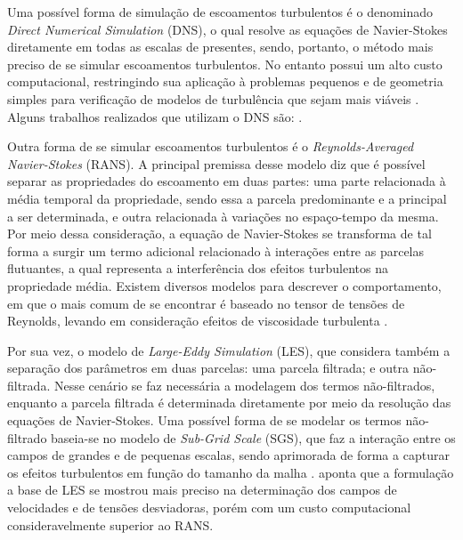 Uma possível forma de simulação de escoamentos turbulentos é o denominado \textit{Direct Numerical Simulation} (DNS), o qual resolve as equações de Navier-Stokes diretamente em todas as escalas de presentes, sendo, portanto, o método mais preciso de se simular escoamentos turbulentos. No entanto possui um alto custo computacional, restringindo sua aplicação à problemas pequenos e de geometria simples para verificação de modelos de turbulência que sejam mais viáveis \cite{piomelli1999large,yokokawa200216}. Alguns trabalhos realizados que utilizam o DNS são: .

Outra forma de se simular escoamentos turbulentos é o \textit{Reynolds-Averaged Navier-Stokes} (RANS). A principal premissa desse modelo diz que é possível separar as propriedades do escoamento em duas partes: uma parte relacionada à média temporal da propriedade, sendo essa a parcela predominante e a principal a ser determinada, e outra relacionada à variações no espaço-tempo da mesma. Por meio dessa consideração, a equação de Navier-Stokes se transforma de tal forma a surgir um termo adicional relacionado à interações entre as parcelas flutuantes, a qual representa a interferência dos efeitos turbulentos na propriedade média. Existem diversos modelos para descrever o comportamento, em que o mais comum de se encontrar é baseado no tensor de tensões de Reynolds, levando em consideração efeitos de viscosidade turbulenta \cite{piomelli1999large,alfonsi2009reynolds,bazilevs2010large,ling2015evaluation}.

Por sua vez, o modelo de \textit{Large-Eddy Simulation} (LES), que considera também a separação dos parâmetros em duas parcelas: uma parcela filtrada; e outra não-filtrada. Nesse cenário se faz necessária a modelagem dos termos não-filtrados, enquanto a parcela filtrada é determinada diretamente por meio da resolução das equações de Navier-Stokes. Uma possível forma de se modelar os termos não-filtrado baseia-se no modelo de \textit{Sub-Grid Scale} (SGS), que faz a interação entre os campos de grandes e de pequenas escalas, sendo aprimorada de forma a capturar os efeitos turbulentos em função do tamanho da malha \cite{ghosal1995basic,hughes2000large,moeng2015large}.
 aponta que a formulação a base de LES se mostrou mais preciso na determinação dos campos de velocidades e de tensões desviadoras, porém com um custo computacional consideravelmente superior ao RANS.


